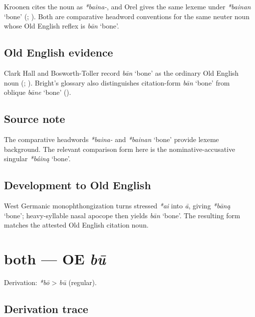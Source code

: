 \documentclass[
  british,
  a4paper,
  openany]{book}
\providecommand{\Recon}[1]{\emph{*#1}}
{\catcode`→=\active \global\def→{\ensuremath{\rightarrow}}}
\providecommand{\texorpdfstring}[2]{#1}
\providecommand{\Recon}[1]{\emph{*#1}}
{\catcode`→=\active \global\def→{\ensuremath{\rightarrow}}}
\begin{document}
Kroonen cites the noun as {\emph{*baina-}}, and Orel gives the same
lexeme under {\Recon{bainan} `bone'} (; ). Both are comparative
headword conventions for the same neuter noun whose Old English reflex
is {\emph{bān}} `bone'.

\subsection{Old English evidence}\label{old-english-evidence-6}

Clark Hall and Bosworth-Toller record {\emph{bān}} `bone' as the
ordinary Old English noun (; ).
Bright's glossary also distinguishes citation-form {\emph{bān}} `bone'
from oblique {\emph{bāne}} `bone'
().

\subsection{Source note}\label{source-note-1}

The comparative headwords {\emph{*baina-}} and {\Recon{bainan} `bone'}
provide lexeme background. The relevant comparison form here is the
nominative-accusative singular {\Recon{báiną} `bone'}.

\subsection{Development to Old
English}\label{development-to-old-english-6}

West Germanic monophthongization turns stressed \emph{*ai} into
\emph{ā}, giving \Recon{bāną} `bone'; heavy-syllable nasal apocope then
yields {\emph{bān}} `bone'. The resulting form matches the attested Old
English citation noun.

\section{\texorpdfstring{both --- OE
\emph{bū}}{both --- OE bū}}\label{both-oe-bux16b}


Derivation: \emph{*bō} \textgreater{} \emph{bū} (regular).

\subsection{Derivation trace}\label{derivation-trace-7}
\end{document}
